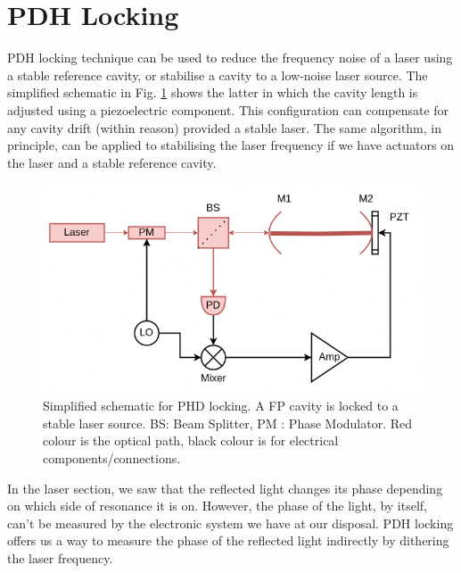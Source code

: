\documentclass{Resources/cquicc}
\begin{document}
\section{PDH Locking}
PDH locking technique can be used to reduce the frequency noise of a laser using a stable reference cavity, or stabilise a cavity to a low-noise laser source. The simplified schematic in Fig. \ref{fig:pdh_schematic} shows the latter in which the cavity length is adjusted using a piezoelectric component. This configuration can compensate for any cavity drift (within reason) provided a stable laser. The same algorithm, in principle, can be applied to stabilising the laser frequency if we have actuators on the laser and a stable reference cavity. \par
\begin{figure}
    \centering
    \includegraphics[width=\linewidth]{images/pdh_locking.drawio.png}
    \caption{Simplified schematic for PHD locking. A FP cavity is locked to a stable laser source. BS: Beam Splitter, PM : Phase Modulator. Red colour is the optical path, black colour is for electrical components/connections.}
    \label{fig:pdh_schematic}
\end{figure}
In the laser section, we saw that the reflected light changes its phase depending on which side of resonance it is on. However, the phase of the light, by itself, can't be measured by the electronic system we have at our disposal. PDH locking offers us a way to measure the phase of the reflected light indirectly by dithering the laser frequency. 
\end{document}

